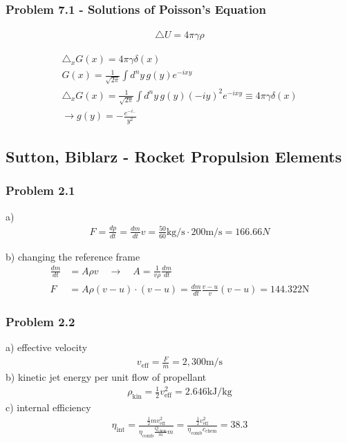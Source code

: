 \documentclass[10pt,a4paper]{book}
\theoremstyle{definition}
\begin{document}
\subsubsection{Problem 7.1 - Solutions of Poisson's Equation}
\begin{align}
    \triangle U=4\pi \gamma\rho
\end{align}

\begin{align}
    \triangle_x G(x)=4\pi \gamma\delta(x)\\
    G(x)=\frac{1}{\sqrt{2\pi}}\int d^ny\,g(y)e^{-ixy}\\
    \triangle_x G(x)=\frac{1}{\sqrt{2\pi}}\int d^ny\,g(y)(-iy)^2e^{-ixy}\equiv4\pi\gamma\delta(x)\\
    \rightarrow g(y)=-\frac{e^{-i..}}{y^2}
\end{align}

\subsection{{\sc Sutton, Biblarz} - Rocket Propulsion Elements}
\subsubsection{Problem 2.1}
a)
\begin{align}
F=\frac{dp}{dt}=\frac{dm}{dt}v=\frac{50}{60}\text{kg/s}\cdot200\text{m/s}=166.66N
\end{align}

b) changing the reference frame
\begin{align}
\frac{dm}{dt}&=A\rho v\quad\rightarrow\quad A=\frac{1}{v\rho}\frac{dm}{dt}\\
F&=A\rho(v-u)\cdot(v-u)=\frac{dm}{dt}\frac{v-u}{v}(v-u)=144.322\text{N}
\end{align}

\subsubsection{Problem 2.2}
a) effective velocity
\begin{align}
v_\text{eff}=\frac{F}{\dot{m}}=2,300\text{m/s}
\end{align}
b) kinetic jet energy per unit flow of propellant
\begin{align}
\rho_\text{kin}=\frac{1}{2}v_\text{eff}^2=2.646\text{kJ/kg}
\end{align}
c) internal efficiency
\begin{align}
\eta_\text{int}=\frac{\frac{1}{2}mv_\text{eff}^2}{\eta_\text{comb}\frac{Q_\text{chem}}{m}m}=\frac{\frac{1}{2}v_\text{eff}^2}{\eta_\text{comb}c_\text{chem}}=38.3%
\end{align}
\end{document}
